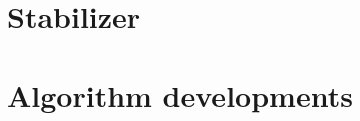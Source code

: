 \documentclass[final,5p,times,twocolumn,authoryear]{elsarticle}
\begin{document}
\section{Stabilizer}
\label{stabilizer}


\section{Algorithm developments}
\label{algorithm}










\end{document}
